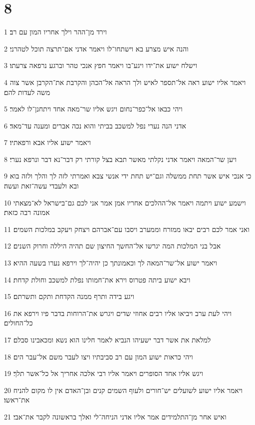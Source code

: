 \chapter{8}

\par 1 וירד מן־ההר וילך אחריו המון עם רב׃
\par 2 והנה איש מצרע בא וישתחו־לו ויאמר אדני אם־תרצה תוכל לטהרני׃
\par 3 וישלח ישוע את־ידו ויגע־בו ויאמר חפץ אנכי טהר וברגע נרפאה צרעתו׃
\par 4 ויאמר אליו ישוע ראה אל־תספר לאיש ולך הראה אל־הכהן והקרבת את־הקרבן אשר צוה משה לעדות להם׃
\par 5 ויהי כבאו אל־כפר־נחום ויגש אליו שר־מאה אחד ויתחנן־לו לאמר׃
\par 6 אדני הנה נערי נפל למשכב בביתי והוא נכה אברים ומענה עד־מאד׃
\par 7 ויאמר ישוע אליו אבא ורפאתיו׃
\par 8 ויען שר־המאה ויאמר אדני נקלתי מאשר תבא בצל קורתי רק דבר־נא דבר ונרפא נערי׃
\par 9 כי אנכי איש אשר תחת ממשלה וגם־יש תחת ידי אנשי צבא ואמרתי לזה לך והלך ולזה בוא ובא ולעבדי עשה־זאת ועשה׃
\par 10 וישמע ישוע ויתמה ויאמר אל־ההלכים אחריו אמן אמר אני לכם גם־בישראל לא־מצאתי אמונה רבה כזאת׃
\par 11 ואני אמר לכם רבים יבאו ממזרח וממערב ויסבו עם־אברהם ויצחק ויעקב במלכות השמים׃
\par 12 אבל בני המלכות המה יגרשו אל־החשך החיצון שם תהיה היללה וחרוק השנים׃
\par 13 ויאמר ישוע אל־שר־המאה לך וכאמונתך כן יהיה־לך וירפא נערו בשעה ההיא׃
\par 14 ויבא ישוע ביתה פטרוס וירא את־חמותו נפלת למשכב וחולת קדחת׃
\par 15 ויגע בידה ותרף ממנה הקדחת ותקם ותשרתם׃
\par 16 ויהי לעת ערב ויביאו אליו רבים אחוזי שדים ויגרש את־הרוחות בדבר פיו וירפא את כל־החולים׃
\par 17 למלאת את אשר דבר ישעיהו הנביא לאמר חלינו הוא נשא ומכאבינו סבלם׃
\par 18 ויהי כראות ישוע המון עם רב סביבתיו ויצו לעבר משם אל־עבר הים׃
\par 19 ויגש אליו אחד הסופרים ויאמר אליו רבי אלכה אחריך אל כל־אשר תלך׃
\par 20 ויאמר אליו ישוע לשועלים יש־חורים ולעוף השמים קנים ובן־האדם אין לו מקום להניח את־ראשו׃
\par 21 ואיש אחר מן־התלמידים אמר אליו אדני הניחה־לי ואלך בראשונה לקבר את־אבי׃
